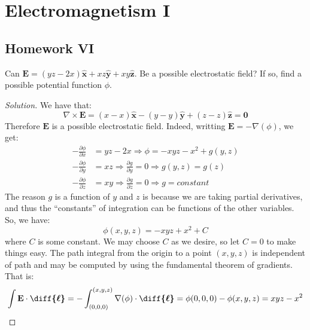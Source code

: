 \documentclass[crop=false,class=article,oneside]{standalone}
\begin{document}
    \ifx\ifphysicscourseselectromagnetismI\undefined
        \section*{Electromagnetism I}
        \setcounter{section}{6}
        \renewcommand\thesubfigure{%
            \arabic{section}.\arabic{figure}.\arabic{subfigure}%
        }
    \fi
    \subsection{Homework VI}
    \begin{problem}[Wangsness 5-1]
        Can
        $\mathbf{E}%
         =(yz-2x)\hat{\mathbf{x}}%
         +xz\hat{\mathbf{y}}%
         +xy\hat{\mathbf{z}}$.
        Be a possible electrostatic field? If so,
        find a possible potential function $\phi$.
    \end{problem}
    \begin{proof}[Solution]
        We have that:
        \begin{equation*}
            \nabla\times\mathbf{E}
            =(x-x)\hat{\mathbf{x}}
            -(y-y)\hat{\mathbf{y}}
            +(z-z)\hat{\mathbf{z}}
            =\mathbf{0}    
        \end{equation*}
        Therefore $\mathbf{E}$ is a possible electrostatic field.
        Indeed, writting $\mathbf{E}=-\nabla(\phi)$, we get:
        \begin{align*}
            -\frac{\partial\phi}{\partial{x}}
            &=yz-2x
            \Rightarrow\phi=-xyz-x^{2}+g(y,z)\\
            -\frac{\partial\phi}{\partial{y}}
            &=xz
            \Rightarrow\frac{\partial{g}}{\partial{y}}=0
            \Rightarrow{g(y,z)=g(z)}\\
            -\frac{\partial\phi}{\partial{z}}
            &=xy
            \Rightarrow\frac{\partial{g}}{\partial{z}}=0
            \Rightarrow{g=constant}
        \end{align*}
        The reason $g$ is a function of $y$ and $z$ is because
        we are taking partial derivatives, and thus the
        ``constants'' of integration can be functions of
        the other variables. So, we have:
        \begin{equation*}
            \phi(x,y,z)=-xyz+x^{2}+C    
        \end{equation*}
        where $C$ is some constant. We may choose $C$ as we desire,
        so let $C=0$ to make things easy. The path integral
        from the origin to a point $(x,y,z)$ is independent
        of path and may be computed by using the fundamental
        theorem of gradients. That is:
        \begin{align*}
            \int\mathbf{E}\cdot\boldsymbol{\diff{\ell}}
            =-\int _{(0,0,0)}^{(x,y,z)}
            \nabla(\phi)\cdot\boldsymbol{\diff{\ell}}
            =\phi(0,0,0)-\phi(x,y,z)
            =xyz-x^2
        \end{align*}
    \end{proof}
\end{document}
